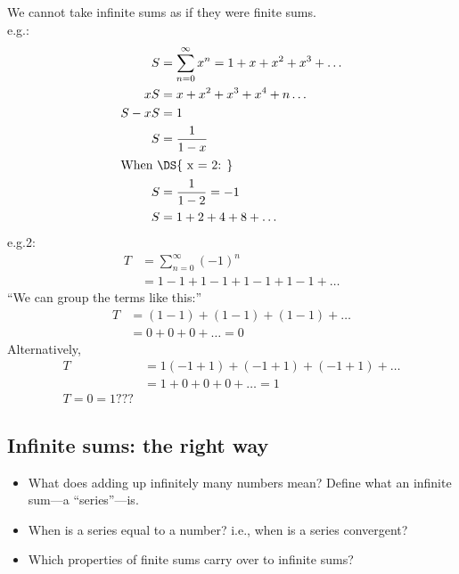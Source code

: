 \documentclass[../13.tex]{subfiles}
\begin{document}
We cannot take infinite sums as if they were finite sums. \\
e.g.: \begin{align*}
  S      & = \sum_{n=0}^{\infty} x^n = 1 + x + x^2 + x^3 + \dots \\
  xS     & = x + x^2 + x^3 + x^4+n\dots                          \\
  S - xS & = 1                                                   \\
  S      & = \frac{1}{1-x}                                       \\
  \intertext{When \DS{ x = 2: }}
  S      & = \frac{1}{1-2} = -1                                  \\
  S      & = 1 + 2 + 4 + 8 + \dots
\end{align*}
e.g.2: \begin{align*}
  T & = \sum_{n = 0}^{\infty} (-1)^n     \\
    & = 1 -1 + 1-1 + 1 -1 + 1 -1 + \dots
\end{align*}
``We can group the terms like this:''\begin{align*}
  T & = (1-1) + (1-1) + (1-1) + \dots \\
    & =0 + 0 + 0 + \dots = 0
\end{align*}
Alternatively,
\begin{align*}
  T & = 1 (-1 + 1) + (-1 + 1) + (-1 + 1) + \dots \\
    & = 1 + 0 + 0 + 0 + \dots = 1                \\
  T = 0 = 1 ???
\end{align*}

\subsection*{Infinite sums: the right way}
\begin{itemize}
  \item What does adding up infinitely many numbers mean? Define what an infinite sum---a ``series''---is.
  \item When is a series equal to a number? i.e., when is a series convergent?
  \item Which properties of finite sums carry over to infinite sums?
\end{itemize}
\newpage
\end{document}
